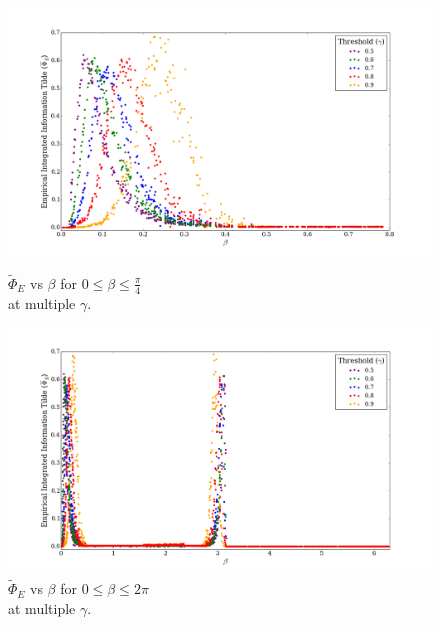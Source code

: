 \documentclass[a4paper,11pt]{article}
\begin{document}
\begin{figure}[H]
\begin{minipage}[b]{0.5\linewidth}
		\begin{center}
		\includegraphics[scale = 0.2]{figures/phi_tilde_vs_beta_orig_multi}
		\caption{
			$\widetilde{\Phi}_E$ vs $\beta$ for $0 \leq \beta \leq \frac{\pi}{4}$\\ at multiple $\gamma$.
			\label{fig:phi-tilde-vs-beta-orig-multi}
		}
		\end{center}
		\vspace{4ex}
	\end{minipage}
	\begin{minipage}[b]{0.5\linewidth}
		\begin{center}
		\includegraphics[scale = 0.2]{figures/phi_tilde_vs_beta_ext_multi}
		\caption{
			$\widetilde{\Phi}_E$ vs $\beta$ for $0 \leq \beta \leq 2\pi$\\ at multiple $\gamma$.
			\label{fig:phi-tilde-vs-beta-ext-multi}
		}
		\end{center}
		\vspace{4ex}
	\end{minipage}

\end{figure}
\end{document}
